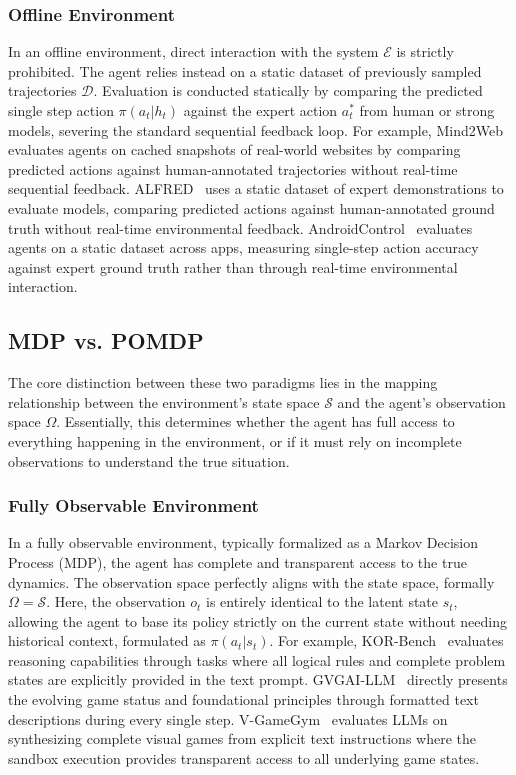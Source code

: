 \documentclass{llmxive}
\begin{document}
\subsubsection{Offline Environment}
In an offline environment, direct interaction with the system $\mathcal{E}$ is strictly prohibited. The agent relies instead on a static dataset of previously sampled trajectories $\mathcal{D}$. Evaluation is conducted statically by comparing the predicted single step action $\pi(a_t | h_t)$ against the expert action $a^*_t$ from human or strong models, severing the standard sequential feedback loop. For example, Mind2Web~\cite{Mind2Web} evaluates agents on cached snapshots of real-world websites by comparing predicted actions against human-annotated trajectories without real-time sequential feedback. ALFRED~\cite{ALFRED} uses a static dataset of expert demonstrations to evaluate models, comparing predicted actions against human-annotated ground truth without real-time environmental feedback. AndroidControl~\cite{AndroidControl} evaluates agents on a static dataset across apps, measuring single-step action accuracy against expert ground truth rather than through real-time environmental interaction.

\subsection{MDP vs. POMDP}
\label{attribute:MDP vs. POMDP}

The core distinction between these two paradigms lies in the mapping relationship between the environment's state space $\mathcal{S}$ and the agent's observation space $\Omega$. Essentially, this determines whether the agent has full access to everything happening in the environment, or if it must rely on incomplete observations to understand the true situation.

\subsubsection{Fully Observable Environment}
In a fully observable environment, typically formalized as a Markov Decision Process (MDP), the agent has complete and transparent access to the true dynamics. The observation space perfectly aligns with the state space, formally $\Omega = \mathcal{S}$. Here, the observation $o_t$ is entirely identical to the latent state $s_t$, allowing the agent to base its policy strictly on the current state without needing historical context, formulated as $\pi(a_t | s_t)$. For example, KOR-Bench~\cite{KOR-Bench} evaluates reasoning capabilities through tasks where all logical rules and complete problem states are explicitly provided in the text prompt. GVGAI-LLM~\cite{GVGAI-LLM} directly presents the evolving game status and foundational principles through formatted text descriptions during every single step. V-GameGym~\cite{V-GameGym} evaluates LLMs on synthesizing complete visual games from explicit text instructions where the sandbox execution provides transparent access to all underlying game states.
\end{document}
